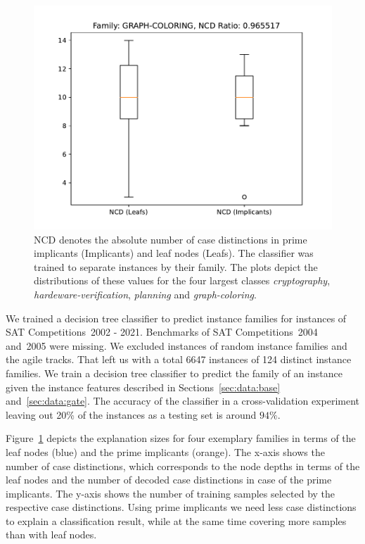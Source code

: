 \documentclass[a4paper, USenglish, cleveref, autoref, thm-restate]{lipics-v2021}
\theoremstyle{definition}
\begin{document}
\begin{figure}
\begin{minipage}{.49\linewidth}
\includegraphics[width=\linewidth]{fig2/dc-graphcoloring.pdf}
\end{minipage}
\caption{NCD denotes the absolute number of case distinctions in prime implicants (Implicants) and leaf nodes (Leafs). 
The classifier was trained to separate instances by their family. 
The plots depict the distributions of these values for the four largest classes \emph{cryptography},  \emph{hardeware-verification}, \emph{planning} and \emph{graph-coloring}.}
\label{fig:eval:families}
\end{figure}

We trained a decision tree classifier to predict instance families for instances of SAT Competitions~2002 - 2021. 
Benchmarks of SAT Competitions~2004 and~2005 were missing. 
We excluded instances of random instance families and the agile tracks. 
That left us with a total 6647 instances of 124 distinct instance families. 
We train a decision tree classifier to predict the family of an instance given the instance features described in Sections~\ref{sec:data:base} and~\ref{sec:data:gate}. 
The accuracy of the classifier in a cross-validation experiment leaving out 20\% of the instances as a testing set is around $94\%$. 

Figure~\ref{fig:eval:families} depicts the explanation sizes for four exemplary families in terms of the leaf nodes (blue) and the prime implicants (orange). 
The x-axis shows the number of case distinctions, which corresponds to the node depths in terms of the leaf nodes and the number of decoded case distinctions in case of the prime implicants. 
The y-axis shows the number of training samples selected by the respective case distinctions. 
Using prime implicants we need less case distinctions to explain a classification result, while at the same time covering more samples than with leaf nodes. 
\end{document}
